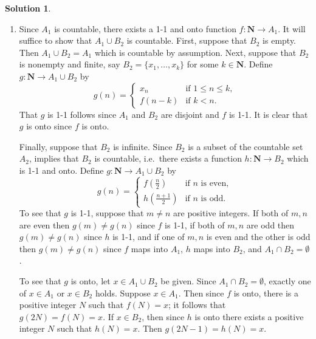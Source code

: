 \documentclass[12pt]{article}
\theoremstyle{definition}
\theoremstyle{exercise}
\theoremstyle{solution}
\newtheorem*{solution}{Solution}
\newcommand{\N}{\mathbf{N}}
\begin{document}
\begin{solution}
    \begin{enumerate}
        \item Since \( A_1 \) is countable, there exists a 1-1 and onto function \( f : \N \to A_1 \). It will suffice to show that \( A_1 \cup B_2 \) is countable. First, suppose that \( B_2 \) is empty. Then \( A_1 \cup B_2 = A_1 \) which is countable by assumption. Next, suppose that \( B_2 \) is nonempty and finite, say \( B_2 = \{ x_1, \ldots, x_k \} \) for some \( k \in \N \). Define \( g : \N \to A_1 \cup B_2 \) by
        \[
            g(n) = \begin{cases}
                x_n & \text{if } 1 \leq n \leq k, \\
                f(n - k) & \text{if } k < n.
            \end{cases}
        \]
        That \( g \) is 1-1 follows since \( A_1 \) and \( B_2 \) are disjoint and \( f \) is 1-1. It is clear that \( g \) is onto since \( f \) is onto.

        Finally, suppose that \( B_2 \) is infinite. Since \( B_2 \) is a subset of the countable set \( A_2 \),  implies that \( B_2 \) is countable, i.e.\ there exists a function \( h : \N \to B_2 \) which is 1-1 and onto. Define \( g : \N \to A_1 \cup B_2 \) by
        \[
            g(n) = \begin{cases}
                f \left( \tfrac{n}{2} \right) & \text{if } n \text{ is even}, \\
                h \left( \tfrac{n+1}{2} \right) & \text{if } n \text{ is odd}.
            \end{cases}
        \]
        To see that \( g \) is 1-1, suppose that \( m \neq n \) are positive integers. If both of \( m, n \) are even then \( g(m) \neq g(n) \) since \( f \) is 1-1, if both of \( m, n \) are odd then \( g(m) \neq g(n) \) since \( h \) is 1-1, and if one of \( m, n \) is even and the other is odd then \( g(m) \neq g(n) \) since \( f \) maps into \( A_1 \), \( h \) maps into \( B_2 \), and \( A_1 \cap B_2 = \emptyset \).

        To see that \( g \) is onto, let \( x \in A_1 \cup B_2 \) be given. Since \( A_1 \cap B_2 = \emptyset \), exactly one of \( x \in A_1 \) or \( x \in B_2 \) holds. Suppose \( x \in A_1 \). Then since \( f \) is onto, there is a positive integer \( N \) such that \( f(N) = x \); it follows that \( g(2N) = f(N) = x \). If \( x \in B_2 \), then since \( h \) is onto there exists a positive integer \( N \) such that \( h(N) = x \). Then \( g(2N - 1) = h(N) = x \).
        

\end{enumerate}
\end{solution}
\end{document}

